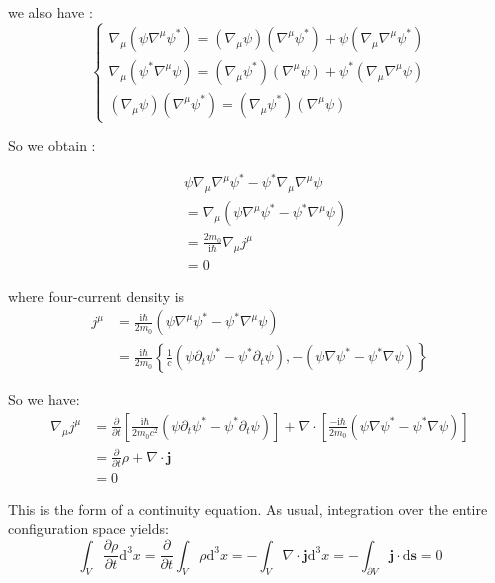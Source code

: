 we also have :
\begin{equation}
\begin{cases}
\nabla_\mu (\psi \nabla^\mu \psi^*) = (\nabla_\mu \psi) (\nabla^\mu \psi^*) + \psi (\nabla_\mu \nabla^\mu \psi^*) \\
\nabla_\mu (\psi^* \nabla^\mu \psi) = (\nabla_\mu \psi^*) (\nabla^\mu \psi) + \psi^* (\nabla_\mu \nabla^\mu \psi) \\
(\nabla_\mu \psi) (\nabla^\mu \psi^*) = (\nabla_\mu \psi^*) (\nabla^\mu \psi)
\end{cases}
\end{equation}

So we obtain :

\begin{equation}
\begin{aligned}
&\psi \nabla_\mu \nabla^\mu \psi^* - \psi^* \nabla_\mu \nabla^\mu \psi \\
&= \nabla_\mu (\psi \nabla^\mu \psi^* - \psi^* \nabla^\mu \psi) \\
&= \frac{2m_0}{\mathrm{i}\hbar} \nabla_\mu j^\mu \\
&= 0
\end{aligned}
\end{equation}

where four-current density is
\begin{equation}
\begin{aligned}
j^\mu &= \frac{\mathrm{i}\hbar}{2m_0} (\psi \nabla^\mu \psi^* - \psi^* \nabla^\mu \psi) \\
&= \frac{\mathrm{i}\hbar}{2m_0} \left\{ \frac{1}{c} (\psi \partial_t \psi^* - \psi^* \partial_t \psi), -(\psi \nabla \psi^* - \psi^* \nabla \psi) \right\}
\end{aligned}
\end{equation}

So we have:
\begin{equation}
\begin{aligned}
\nabla_\mu j^\mu &= \frac{\partial}{\partial t} \left[ \frac{\mathrm{i}\hbar}{2m_0 c^2} (\psi \partial_t \psi^* - \psi^* \partial_t \psi) \right] + \nabla \cdot \left[ \frac{-\mathrm{i}\hbar}{2m_0} (\psi \nabla \psi^* - \psi^* \nabla \psi) \right] \\
&= \frac{\partial}{\partial t} \rho + \nabla \cdot \bm{j} \\
&= 0
\end{aligned}
\end{equation}

This is the form of a continuity equation. As usual, integration over the entire configuration space yields:
\begin{equation}
\int_V \frac{\partial \rho}{\partial t} \mathrm{d}^3 x = \frac{\partial}{\partial t} \int_V \rho \mathrm{d}^3 x = - \int_V \nabla \cdot \bm{j} \mathrm{d}^3 x = - \int_{\partial V} \bm{j} \cdot \mathrm{d}\bm{s} = 0
\end{equation}

